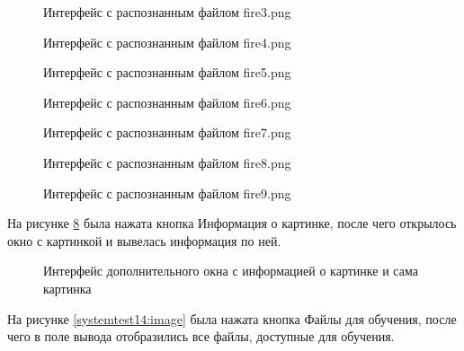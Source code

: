 \begin{figure}[H]
\caption{Интерфейс с распознанным файлом fire3.png}
\label{systemtest6:image}
\end{figure}

\begin{figure}[H]
\caption{Интерфейс с распознанным файлом fire4.png}
\label{systemtest7:image}
\end{figure}

\begin{figure}[H]
\caption{Интерфейс с распознанным файлом fire5.png}
\label{systemtest8:image}
\end{figure}

\begin{figure}[H]
\caption{Интерфейс с распознанным файлом fire6.png}
\label{systemtest9:image}
\end{figure}

\begin{figure}[H]
\caption{Интерфейс с распознанным файлом fire7.png}
\label{systemtest10:image}
\end{figure}

\begin{figure}[H]
\caption{Интерфейс с распознанным файлом fire8.png}
\label{systemtest11:image}
\end{figure}

\begin{figure}[H]
\caption{Интерфейс с распознанным файлом fire9.png}
\label{systemtest12:image}
\end{figure}

На рисунке \ref{systemtest22:image} была нажата кнопка Информация о картинке, после чего открылось окно с картинкой и вывелась информация по ней.

\begin{figure}[H]
\caption{Интерфейс дополнительного окна с информацией о картинке и сама картинка}
\label{systemtest22:image}
\end{figure}

На рисунке \ref{systemtest14:image} была нажата кнопка Файлы для обучения, после чего в поле вывода отобразились все файлы, доступные для обучения.

